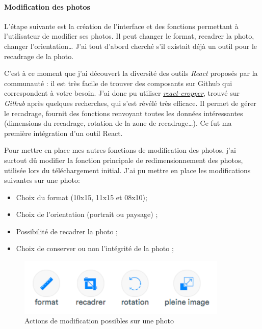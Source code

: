 \bigskip

\paragraph{Modification des photos}\label{modification-des-photos}

\bigskip

L'étape suivante est la création de l'interface et des fonctions
permettant à l'utilisateur de modifier ses photos. Il peut changer le
format, recadrer la photo, changer l'orientation\ldots{} J'ai tout
d'abord cherché s'il existait déjà un outil pour le recadrage de la
photo.

\bigskip

C'est à ce moment que j'ai découvert la diversité des outils
\emph{React} proposés par la communauté : il est très facile de trouver
des composants sur Github qui correspondent à votre besoin. J'ai donc pu
utiliser
\href{https://github.com/roadmanfong/react-cropper}{\emph{react-cropper}},
trouvé sur \emph{Github} après quelques recherches, qui s'est révélé
très efficace. Il permet de gérer le recadrage, fournit des fonctions
renvoyant toutes les données intéressantes (dimensions du recadrage,
rotation de la zone de recadrage\ldots{}). Ce fut ma première
intégration d'un outil React.

\bigskip

Pour mettre en place mes autres fonctions de modification des photos,
j'ai surtout dû modifier la fonction principale de redimensionnement des
photos, utilisée lors du téléchargement initial. J'ai pu mettre en place
les modifications suivantes sur une photo:

\begin{itemize}
\tightlist
\item
  Choix du format (10x15, 11x15 et 08x10);
\item
  Choix de l'orientation (portrait ou paysage) ;
\item
  Possibilité de recadrer la photo ;
\item
  Choix de conserver ou non l'intégrité de la photo ;
\end{itemize}

\begin{figure}[h]
  \centering
  \includegraphics[width=10cm]{figures/photolix-1.png}
  \caption{Actions de modification possibles sur une photo}
\end{figure}

